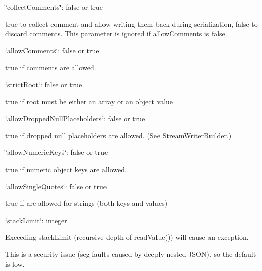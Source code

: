 \begin{DoxyItemize}
\item {\ttfamily \char`\"{}collect\+Comments\char`\"{}\+: false or true}
\begin{DoxyItemize}
\item true to collect comment and allow writing them back during serialization, false to discard comments. This parameter is ignored if allow\+Comments is false.
\end{DoxyItemize}
\item {\ttfamily \char`\"{}allow\+Comments\char`\"{}\+: false or true}
\begin{DoxyItemize}
\item true if comments are allowed.
\end{DoxyItemize}
\item {\ttfamily \char`\"{}strict\+Root\char`\"{}\+: false or true}
\begin{DoxyItemize}
\item true if root must be either an array or an object value
\end{DoxyItemize}
\item {\ttfamily \char`\"{}allow\+Dropped\+Null\+Placeholders\char`\"{}\+: false or true}
\begin{DoxyItemize}
\item true if dropped null placeholders are allowed. (See \hyperlink{class_json_1_1_stream_writer_builder}{Stream\+Writer\+Builder}.)
\end{DoxyItemize}
\item {\ttfamily \char`\"{}allow\+Numeric\+Keys\char`\"{}\+: false or true}
\begin{DoxyItemize}
\item true if numeric object keys are allowed.
\end{DoxyItemize}
\item {\ttfamily \char`\"{}allow\+Single\+Quotes\char`\"{}\+: false or true}
\begin{DoxyItemize}
\item true if \textquotesingle{}\textquotesingle{} are allowed for strings (both keys and values)
\end{DoxyItemize}
\item {\ttfamily \char`\"{}stack\+Limit\char`\"{}\+: integer}
\begin{DoxyItemize}
\item Exceeding stack\+Limit (recursive depth of {\ttfamily read\+Value()}) will cause an exception.
\item This is a security issue (seg-\/faults caused by deeply nested J\+S\+O\+N), so the default is low.

\end{DoxyItemize}
\end{DoxyItemize}
